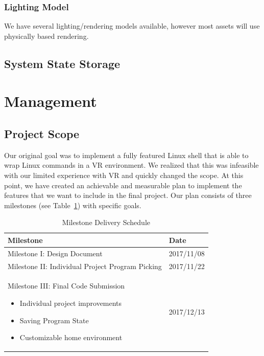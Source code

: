 \documentclass[titlepage,12pt]{article}
\begin{document}
\subsubsection{Lighting Model} We have several lighting/rendering models
available, however most assets will use physically based rendering.

\subsection{System State Storage}\label{sec:state}

\section{Management}

\subsection{Project Scope}
Our original goal was to implement a fully featured Linux shell that is able to
wrap Linux commands in a VR environment. We realized that this was infeasible
with our limited experience with VR and quickly changed the scope. At this
point, we have created an achievable and measurable plan to implement the
features that we want to include in the final project. Our plan consists of
three milestones (see Table~\ref{tab:milestones}) with specific goals.

\begin{table}[H]
    \caption{Milestone Delivery Schedule}\label{tab:milestones}
    \centering
    \begin{tabular}{|p{10cm}|l|}
        \hline
        \textbf{Milestone} & \textbf{Date} \\
        \hline\hline
        Milestone I: Design Document & 2017/11/08 \\
        \hline
        Milestone II: Individual Project Program Picking & 2017/11/22 \\
        \hline
        Milestone III: Final Code Submission
        \begin{itemize}
            \item Individual project improvements
            \item Saving Program State
            \item Customizable home environment
        \end{itemize} & 2017/12/13\\
        \hline
    \end{tabular}
\end{table}
\end{document}
